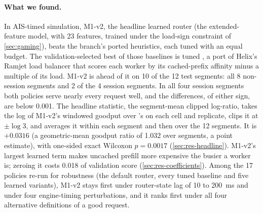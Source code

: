 \paragraph{What we found.}
In AIS-timed simulation, M1-v2, the headline learned router (the extended-feature \lc{} model,
with 23 features, trained under the load-sign constraint of \cref{sec:gaming}), beats the branch's
ported heuristics, each tuned with an equal budget.\lmetricfix{}
The validation-selected best of those baselines is tuned , a port of Helix's Ramjet
load balancer \citep{ramjet} that scores each worker by its cached-prefix affinity minus a multiple of its load.
M1-v2 is ahead of it on 10 of the 12 test segments: all 8 non-session segments and 2 of the 4 session
segments. In all four session segments both policies serve nearly every request well, and the
differences, of either sign, are below 0.001.
The headline statistic, the segment-mean clipped log-ratio, takes the log
of M1-v2's windowed goodput over 's on each cell and replicate, clips it at
$\pm\log 3$, and averages it within each segment and then over the 12 segments. It is $+0.0316$
(a geometric-mean goodput ratio of 1.032 over segments, a point estimate), with one-sided exact
Wilcoxon $p = 0.0017$ (\cref{sec:res-headline}).
M1-v2's largest learned term makes uncached prefill more expensive the busier a worker is; zeroing
it costs 0.018 of validation score (\cref{sec:res-coefficients}).
Among the 17 policies re-run for robustness (the default router, every tuned baseline and five
learned variants), M1-v2 stays first under router-state lag of 10 to \SI{200}{ms} and under four
engine-timing perturbations, and it ranks first under all four alternative definitions of a good
request.

